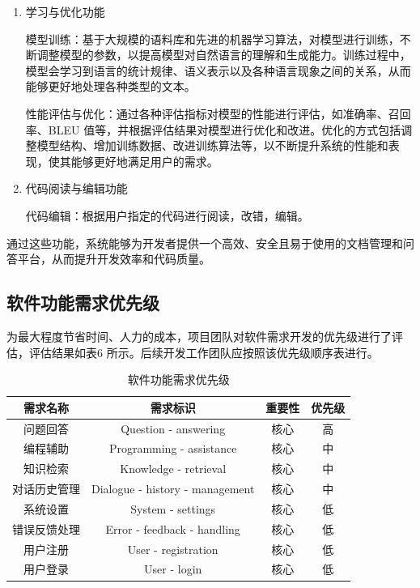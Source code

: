 \documentclass[
    report,     %
    oneside,    %
    UTF8,       %
    zihao=-4    %
]{config} %
\begin{document}
\begin{enumerate}[label=(\arabic*)]
\item 学习与优化功能

模型训练：基于大规模的语料库和先进的机器学习算法，对模型进行训练，不断调整模型的参数，以提高模型对自然语言的理解和生成能力。训练过程中，模型会学习到语言的统计规律、语义表示以及各种语言现象之间的关系，从而能够更好地处理各种类型的文本。

性能评估与优化：通过各种评估指标对模型的性能进行评估，如准确率、召回率、BLEU 值等，并根据评估结果对模型进行优化和改进。优化的方式包括调整模型结构、增加训练数据、改进训练算法等，以不断提升系统的性能和表现，使其能够更好地满足用户的需求。

\item 代码阅读与编辑功能

代码编辑：根据用户指定的代码进行阅读，改错，编辑。
\end{enumerate}


通过这些功能，系统能够为开发者提供一个高效、安全且易于使用的文档管理和问答平台，从而提升开发效率和代码质量。

\subsection{软件功能需求优先级}
为最大程度节省时间、人力的成本，项目团队对软件需求开发的优先级进行了评估，评估结果如表6 所示。后续开发工作团队应按照该优先级顺序表进行。
\begin{table}[H] %
    \centering %
    \caption{软件功能需求优先级} %
    \label{tab:priority} %
    \renewcommand\arraystretch{0.85} %
    \setlength{\tabcolsep}{12pt} %
    \begin{tabular}{cccc}
        \toprule[1.5pt] %
        \textbf{需求名称} & \textbf{需求标识} & \textbf{重要性} & \textbf{优先级} \\ %
        \midrule[0.8pt] %
            问题回答 & Question - answering & 核心 & 高 \\
            编程辅助 & Programming - assistance & 核心 & 中 \\
            知识检索 & Knowledge - retrieval & 核心 & 中 \\
            对话历史管理 & Dialogue - history - management & 核心 & 中 \\
            系统设置 & System - settings & 核心 & 低 \\
            错误反馈处理 & Error - feedback - handling & 核心 & 低 \\
            用户注册 & User - registration & 核心 & 低 \\
            用户登录 & User - login & 核心 & 低 \\
        \bottomrule %
    \end{tabular}
\end{table}
\end{document}
